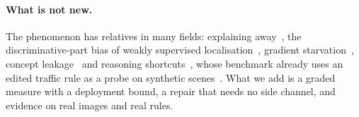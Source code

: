 \paragraph{What is not new.} The phenomenon has relatives in many fields: explaining away~\cite{pearl1988}, the discriminative-part bias of weakly supervised localisation~\cite{zhou2016cam,singh2017hide}, gradient starvation~\cite{pezeshki2021gradient}, concept leakage~\cite{mahinpei2021promises,havasi2022leakage} and reasoning shortcuts~\cite{marconato2023not,bortolotti2025shortcuts}, whose benchmark already uses an edited traffic rule as a probe on synthetic scenes~\cite{bortolotti2024rsbench}. What we add is a graded measure with a deployment bound, a repair that needs no side channel, and evidence on real images and real rules.
